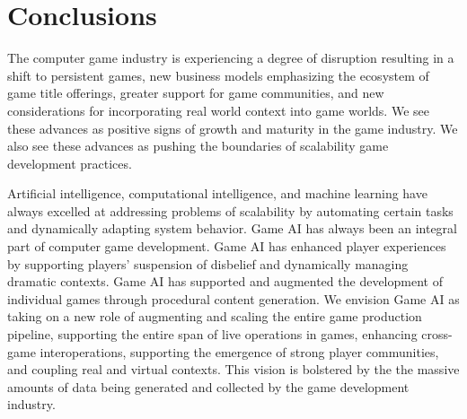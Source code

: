 \documentclass[conference]{IEEEtran}
\begin{document}
%


\section{Conclusions}

The computer game industry is experiencing a degree of disruption resulting in a shift to persistent games, new business models emphasizing the ecosystem of game title offerings, greater support for game communities, and new considerations for incorporating real world context into game worlds.
We see these advances as positive signs of growth and maturity in the game industry.
We also see these advances as pushing the boundaries of scalability game development practices.

Artificial intelligence, computational intelligence, and machine learning have always excelled at addressing problems of scalability by automating certain tasks and dynamically adapting system behavior.
Game AI
has always been an integral part of computer game development.
Game AI has enhanced player experiences by supporting players' suspension of disbelief and dynamically managing dramatic contexts.
Game AI has supported and augmented the development of individual games through procedural content generation.
%
We envision Game AI as taking on a new role of augmenting and scaling the entire game production pipeline, supporting the entire span of live operations in games, enhancing cross-game interoperations, supporting the emergence of strong player communities, and coupling real and virtual contexts.
This vision is bolstered by the the massive amounts of data being generated and collected by the game development industry.
\end{document}
